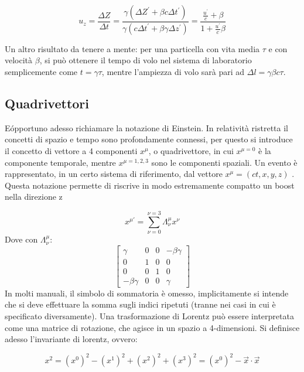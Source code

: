 \begin{equation}
u_z = \frac{\Delta Z}{\Delta t } = \dfrac{\gamma(\Delta Z^{'} + \beta c \Delta t ^{'})}{\gamma(c \Delta t^{'} + \beta \gamma \Delta z^{'})}  = \dfrac{\frac{u^{'}}{c} + \beta}{1 +  \frac{u^{'}}{c}\beta}
\end{equation}


Un altro risultato da tenere a mente: per una particella con vita media $\tau$ e con velocità $\beta$, si può ottenere il tempo di volo nel sistema di laboratorio semplicemente come $ t = \gamma \tau$, mentre l'ampiezza di volo sarà pari ad $\Delta l = \gamma \beta c  \tau$. 

\subsection{Quadrivettori}

E\' opportuno adesso richiamare la notazione di Einstein. In relatività ristretta il concetti di spazio e tempo sono profondamente connessi, per questo si introduce il concetto di vettore a 4 componenti $x^{\mu}$, o quadrivettore, in cui $x^{\mu = 0}$ è la componente temporale, mentre $x^{\mu = 1,2,3}$ sono le componenti spaziali. Un evento è rappresentato, in un certo sistema di riferimento, dal vettore $x^{\mu} = (ct, x , y, z)$ . Questa notazione permette di riscrive in modo estremamente compatto un boost nella direzione z 

\begin{equation}
x^{\mu'} = \sum _{\nu = 0}^{\nu = 3} \Lambda^\mu_\nu x^\nu 
\end{equation}
Dove con $\Lambda^\mu_\nu$:
\[
\begin{bmatrix}
\gamma & 0 & 0 & -\beta \gamma \\ 
0 & 1 & 0 & 0 \\ 
0 & 0 & 1 & 0 \\ 
- \beta \gamma & 0 & 0 & \gamma
\end{bmatrix} 
\]
In molti manuali, il simbolo di sommatoria è omesso, implicitamente si intende che si deve effettuare la somma sugli indici ripetuti (tranne nei casi in cui è specificato diversamente).
Una trasformazione di Lorentz può essere interpretata come una matrice di rotazione, che agisce in un spazio a 4-dimensioni. Si definisce adesso l'invariante di lorentz, ovvero:

\begin{equation*}
x^2 = (x^0)^2 - (x^1)^2 + (x^2)^2 + (x^3)^2 = (x^0)^2 - \vec{x} \cdot \vec{x}
\end{equation*}

